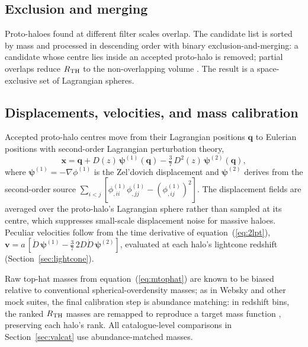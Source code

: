 \subsection{Exclusion and merging}
\label{sec:algorithm-exclusion}

Proto-haloes found at different filter scales overlap. The candidate list is
sorted by mass and processed in descending order with binary
exclusion-and-merging: a candidate whose centre lies inside an accepted
proto-halo is removed; partial overlaps reduce $R_{\rm TH}$ to the
non-overlapping volume \citep[the ``binary reduction'' of][]{Stein2019}.
The result is a space-exclusive set of Lagrangian spheres.

\subsection{Displacements, velocities, and mass calibration}
\label{sec:algorithm-2lpt}

Accepted proto-halo centres move from their Lagrangian positions $\bm{q}$ to
Eulerian positions with second-order Lagrangian perturbation theory,
\begin{equation}
  \bm{x} = \bm{q} + D(z)\,\bm{\psi}^{(1)}(\bm{q})
         - \tfrac{3}{7}\,D^2(z)\,\bm{\psi}^{(2)}(\bm{q}),
  \label{eq:2lpt}
\end{equation}
where $\bm{\psi}^{(1)} = -\nabla\phi^{(1)}$ is the Zel'dovich displacement and
$\bm{\psi}^{(2)}$ derives from the second-order source
$\sum_{i<j}[\phi^{(1)}_{,ii}\phi^{(1)}_{,jj}-(\phi^{(1)}_{,ij})^2]$. The
displacement fields are averaged over the proto-halo's Lagrangian sphere
rather than sampled at its centre, which suppresses small-scale displacement
noise for massive haloes. Peculiar velocities follow from the time derivative
of equation~(\ref{eq:2lpt}),
$\bm{v} = a\,[\dot D\,\bm{\psi}^{(1)} - \tfrac{3}{7}\,2 D \dot D\,
\bm{\psi}^{(2)}]$, evaluated at each halo's lightcone redshift
(Section~\ref{sec:lightcone}). 

Raw top-hat masses from equation~(\ref{eq:mtophat}) are known to be biased
relative to conventional spherical-overdensity masses; as in Websky and other
mock suites, the final calibration step is abundance matching: in redshift
bins, the ranked $R_{\rm TH}$ masses are remapped to reproduce a target mass
function \citep[we use][]{Tinker2008}, preserving each halo's rank. All
catalogue-level comparisons in Section~\ref{sec:valcat} use abundance-matched
masses.
